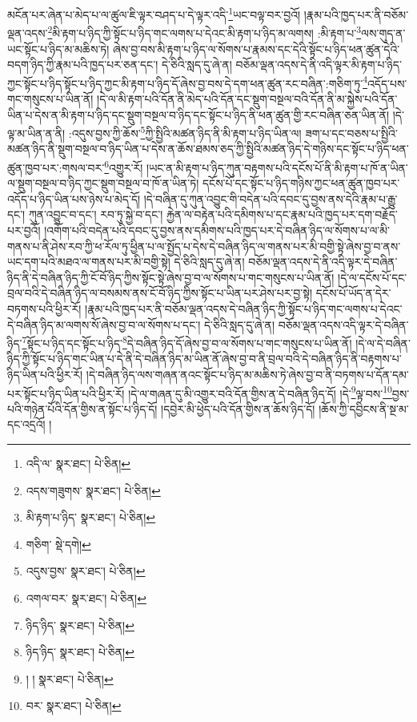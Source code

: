 མངོན་པར་ཞེན་པ་མེད་པ་ལ་ཚུལ་ཇི་ལྟར་བཤད་པ་དེ་ལྟར་འདི་\footnote{འདི་ལ་  སྣར་ཐང་།  པེ་ཅིན། }ཡང་བལྟ་བར་བྱའོ། །རྣམ་པའི་ཁྱད་པར་ནི་བཅོམ་ལྡན་འདས་\footnote{འདས་གཟུགས་  སྣར་ཐང་།  པེ་ཅིན། }མི་རྟག་པ་ཉིད་ཀྱི་སྟོང་པ་ཉིད་གང་ལགས་པ་དེའང་མི་རྟག་པ་ཉིད་མ་ལགས། :མི་རྟག་པ་\footnote{མི་རྟག་པ་ཉིད་  སྣར་ཐང་།  པེ་ཅིན། }ལས་གུད་ན་ཡང་སྟོང་པ་ཉིད་མ་མཆིས་ཏེ། ཞེས་བྱ་བས་མི་རྟག་པ་ཉིད་ལ་སོགས་པ་རྣམས་དང་དེའི་སྟོང་པ་ཉིད་ཕན་ཚུན་དེའི་བདག་ཉིད་ཀྱི་རྣམ་པའི་ཁྱད་པར་ཅན་དང་། དེ་ཅིའི་སླད་དུ་ཞེ་ན། བཅོམ་ལྡན་འདས་དེ་ནི་འདི་ལྟར་མི་རྟག་པ་ཉིད་ཀྱང་སྟོང་པ་ཉིད་སྟོང་པ་ཉིད་ཀྱང་མི་རྟག་པ་ཉིད་དོ་ཞེས་བྱ་བས་དེ་དག་ཕན་ཚུན་རང་བཞིན་:གཅིག་ཏུ་\footnote{གཅིག་  སྡེ་དགེ། }འདོད་པས་གང་གསུངས་པ་ཡིན་ནོ། །དེ་ལ་མི་རྟག་པའི་དོན་ནི་མེད་པའི་དོན་དང་སྡུག་བསྔལ་བའི་དོན་ནི་མ་སྐྱེས་པའི་དོན་ཡིན་པ་དེས་ན་མི་རྟག་པ་ཉིད་དང་སྡུག་བསྔལ་བ་ཉིད་དང་སྟོང་པ་ཉིད་ནི་ཕན་ཚུན་གྱི་རང་བཞིན་ཅན་ཡིན་ནོ། །དེ་ལྟ་མ་ཡིན་ན་ནི། :འདུས་བྱས་ཀྱི་ཆོས་\footnote{འདུས་བྱས་  སྣར་ཐང་།  པེ་ཅིན། }ཀྱི་སྤྱིའི་མཚན་ཉིད་ནི་མི་རྟག་པ་ཉིད་ཡིན་ལ། ཟག་པ་དང་བཅས་པ་སྤྱིའི་མཚན་ཉིད་ནི་སྡུག་བསྔལ་བ་ཉིད་ཡིན་པ་དེས་ན་ཆོས་ཐམས་ཅད་ཀྱི་སྤྱིའི་མཚན་ཉིད་དེ་གཉིས་དང་སྟོང་པ་ཉིད་ཕན་ཚུན་ཁྱབ་པར་:གསལ་བར་\footnote{འགལ་བར་  སྣར་ཐང་།  པེ་ཅིན། }འགྱུར་རོ། །ཡང་ན་མི་རྟག་པ་ཉིད་ཀུན་བརྟགས་པའི་དངོས་པོ་ནི་མི་རྟག་པ་ཁོ་ན་ཡིན་ལ་སྡུག་བསྔལ་བ་ཉིད་ཀྱང་སྡུག་བསྔལ་བ་ཁོ་ན་ཡིན་ཏེ། དངོས་པོ་དང་སྟོང་པ་ཉིད་གཉིས་ཀྱང་ཕན་ཚུན་ཁྱབ་པར་འདོད་པ་ཉིད་ཡིན་པས་ཉེས་པ་མེད་དོ། །དེ་བཞིན་དུ་ཀུན་འབྱུང་གི་བདེན་པའི་དབང་དུ་བྱས་ནས་དེའི་རྣམ་པ་རྒྱུ་དང་། ཀུན་འབྱུང་བ་དང་། རབ་ཏུ་སྐྱེ་བ་དང་། རྐྱེན་ལ་བརྟེན་པའི་དམིགས་པ་དང་རྣམ་པའི་ཁྱད་པར་དག་བརྗོད་པར་བྱའོ། །འགོག་པའི་བདེན་པའི་དབང་དུ་བྱས་ནས་དམིགས་པའི་ཁྱད་པར་དེ་བཞིན་ཉིད་ལ་སོགས་པ་ལ་མི་གནས་པ་ནི་ཤེས་རབ་ཀྱི་ཕ་རོལ་ཏུ་ཕྱིན་པ་ལ་སྤྱོད་པ་དེས་དེ་བཞིན་ཉིད་ལ་གནས་པར་མི་བགྱི་སྟེ་ཞེས་བྱ་བ་ནས་ཡང་དག་པའི་མཐའ་ལ་གནས་པར་མི་བགྱི་སྟེ། དེ་ཅིའི་སླད་དུ་ཞེ་ན། བཅོམ་ལྡན་འདས་དེ་ནི་འདི་ལྟར་དེ་བཞིན་ཉིད་ནི་དེ་བཞིན་ཉིད་ཀྱི་ངོ་བོ་ཉིད་ཀྱིས་སྟོང་སྟེ་ཞེས་བྱ་བ་ལ་སོགས་པ་གང་གསུངས་པ་ཡིན་ནོ། །དེ་ལ་དངོས་པོ་དང་བྲལ་བའི་དེ་བཞིན་ཉིད་ལ་བསམས་ནས་ངོ་བོ་ཉིད་ཀྱིས་སྟོང་པ་ཡིན་པར་ཤེས་པར་བྱ་སྟེ། དངོས་པོ་ཡོད་ན་དེར་བཏགས་པའི་ཕྱིར་རོ། །རྣམ་པའི་ཁྱད་པར་ནི་བཅོམ་ལྡན་འདས་དེ་བཞིན་ཉིད་ཀྱི་སྟོང་པ་ཉིད་གང་ལགས་པ་དེའང་དེ་བཞིན་ཉིད་མ་ལགས་སོ་ཞེས་བྱ་བ་ལ་སོགས་པ་དང་། དེ་ཅིའི་སླད་དུ་ཞེ་ན། བཅོམ་ལྡན་འདས་འདི་ལྟར་དེ་བཞིན་ཉིད་\footnote{ཉིད་ཉིད་  སྣར་ཐང་།  པེ་ཅིན། }སྟོང་པ་ཉིད་དང་སྟོང་པ་ཉིད་\footnote{ཉིད་ཉིད་  སྣར་ཐང་།  པེ་ཅིན། }དེ་བཞིན་ཉིད་དོ་ཞེས་བྱ་བ་ལ་སོགས་པ་གང་གསུངས་པ་ཡིན་ནོ། །དེ་ལ་དེ་བཞིན་ཉིད་ཀྱི་སྟོང་པ་ཉིད་གང་ཡིན་པ་དེ་ནི་དེ་བཞིན་ཉིད་མ་ཡིན་ནོ་ཞེས་བྱ་བ་ནི་བྲལ་བའི་དེ་བཞིན་ཉིད་ནི་བརྟགས་པ་ཉིད་ཡིན་པའི་ཕྱིར་རོ། །དེ་བཞིན་ཉིད་ལས་གཞན་ནའང་སྟོང་པ་ཉིད་མ་མཆིས་ཏེ་ཞེས་བྱ་བ་ནི་བཏགས་པ་དོན་དམ་པར་སྟོང་པ་ཉིད་ཡིན་པའི་ཕྱིར་རོ། །དེ་ལ་གཞན་དུ་མི་འགྱུར་བའི་དོན་གྱིས་ན་དེ་བཞིན་ཉིད་དོ། །དེ་\footnote{། །  སྣར་ཐང་།  པེ་ཅིན། }ལྟ་བས་\footnote{བར་  སྣར་ཐང་།  པེ་ཅིན། }བྱས་པའི་གཉེན་པོའི་དོན་གྱིས་ན་སྟོང་པ་ཉིད་དོ། །དབྱེར་མི་ཕྱེད་པའི་དོན་གྱིས་ན་ཆོས་ཉིད་དོ། །ཆོས་ཀྱི་དབྱིངས་ནི་སྔ་མ་དང་འདྲའོ། །
